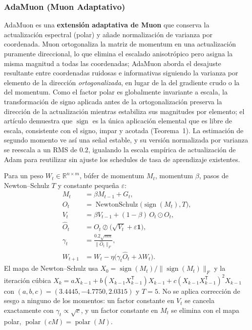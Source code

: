 \subsubsection{AdaMuon (Muon Adaptativo)}
AdaMuon es una \textbf{extensión adaptativa de Muon} que conserva la actualización espectral (polar) y añade normalización de varianza por coordenada. Muon ortogonaliza la matriz de momentum en una actualización puramente direccional, lo que elimina el escalado anisotrópico pero asigna la misma magnitud a todas las coordenadas; AdaMuon aborda el desajuste resultante entre coordenadas ruidosas e informativas siguiendo la varianza por elemento de la dirección \emph{ortogonalizada}, en lugar de la del gradiente crudo o la del momentum. Como el factor polar es globalmente invariante a escala, la transformación de signo aplicada antes de la ortogonalización preserva la dirección de la actualización mientras estabiliza sus magnitudes por elemento; el artículo demuestra que $\operatorname{sign}$ es la única aplicación elemental que es libre de escala, consistente con el signo, impar y acotada (Teorema~1). La estimación de segundo momento ve así una señal estable, y su versión normalizada por varianza se reescala a un RMS de $0.2$, igualando la escala empírica de actualización de Adam para reutilizar sin ajuste los schedules de tasa de aprendizaje existentes.

Para un peso $W_t \in \mathbb{R}^{n \times m}$, búfer de momentum $M_t$, momentum $\beta$, pasos de Newton--Schulz $T$ y constante pequeña $\varepsilon$:
\begin{align}
M_t &= \beta M_{t-1} + G_t, \\
O_t &= \operatorname{NewtonSchulz}\bigl(\operatorname{sign}(M_t), T\bigr), \\
V_t &= \beta V_{t-1} + (1-\beta)\, O_t \odot O_t, \\
\widehat{O}_t &= O_t \oslash \bigl(\sqrt{V_t} + \varepsilon \mathbf{1}\bigr), \\
\gamma_t &= \frac{0.2\sqrt{mn}}{\|\widehat{O}_t\|_F}, \\
W_{t+1} &= W_t - \eta\bigl(\gamma_t \widehat{O}_t + \lambda W_t\bigr).
\end{align}
El mapa de Newton--Schulz usa $X_0 = \operatorname{sign}(M_t)/\|\operatorname{sign}(M_t)\|_F$ y la iteración cúbica $X_k = aX_{k-1} + b(X_{k-1}X_{k-1}^{\mathsf T})X_{k-1} + c(X_{k-1}X_{k-1}^{\mathsf T})^2X_{k-1}$ con $(a,b,c) = (3.4445, -4.7750, 2.0315)$ y $T = 5$. No se aplica corrección de sesgo a ninguno de los momentos: un factor constante en $V_t$ se cancela exactamente con $\gamma_t \propto \sqrt{c}$, y un factor constante en $M_t$ se elimina con el mapa polar, $\operatorname{polar}(cM) = \operatorname{polar}(M)$.


